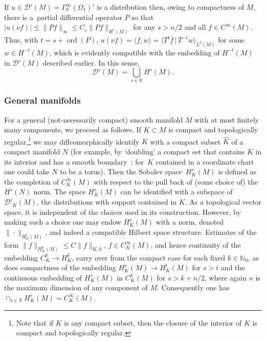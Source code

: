 \documentclass[pdftex]{sigma}
\numberwithin{equation}{section}
\newcommand{\RR}{{\mathbb R}}
\newcommand{\NN}{{\mathbb N}}
\newcommand{\GoinX}[1]{\Gamma_0^\infty({#1})}
\newcommand{\DD}{{\mathscr D}}
\newcommand{\ip}[2]{{\big\langle #1 \, \big|\, #2\big\rangle}}
\begin{document}
 If $u\in \DD'(M)= \GoinX{\Omega_1}'$ is a distribution then, owing to compactness of $M$, there is a~partial differential operator $P$ so that $|u(\nu f)|\le \|Pf\|_\infty \le C_s \|Pf\|_{H^s(M)}$ for any $s>n/2$ and all $f\in C^\infty(M)$. Thus, with $t=s+\operatorname{ord} (P)$, $u(\nu f)= \big\langle \overline{f},w\big\rangle= \ip{T^t \overline{f}}{T^{-t}w}_{L^2(M)}$ for some $w\in H^{-t}(M)$, which is evidently compatible with the embedding of $H^{-t}(M)$ in $\DD'(M)$
 described earlier. In this sense,
 \begin{equation*}
 	\DD'(M) = \bigcup_{s\in\RR} H^{s}(M).
 \end{equation*}

 \subsubsection{General manifolds}

 For a general (not-necessarily compact) smooth manifold $M$ with at most finitely many components,
 we proceed as follows. If $K\subset M$ is compact and topologically regular,\footnote{Note that if $K$ is any compact subset, then the closure of the interior of $K$ is compact and topologically regular.} we may
 diffeomorphically identify $K$ with a compact subset $\hat{K}$ of a compact manifold $N$ (for example, by `doubling' a compact set that contains $K$ in its interior and has a smooth boundary~\cite{BaerWafo:2015}; for~$K$ contained in a coordinate chart one could take $N$ to be a torus). Then the Sobolev space~$H^s_K(M)$ is defined as the completion of
 $C^\infty_K(M)$ with respect to the pull back of (some choice of) the~$H^s(N)$ norm. The space $H^s_K(M)$ can be identified with a subspace of $\DD'_K(M)$, the distributions with support contained in $K$. As a topological vector space, it is independent of the choices used in its construction. However, by making such a choice one may
 endow $H^s_K(M)$ with a norm, denoted $\|\cdot\|_{H^s_K(M)}$, and indeed a compatible Hilbert space structure.
 Estimates of the form
 $\|f\|_{H^k_K(M)}\le C\|f\|_{K,k}$, $f\in C^\infty_K(M)$, and hence continuity of
 the embedding $C^k_K\to H^k_K$, carry over from the compact case for each fixed $k\in\NN_0$, as does compactness of the embedding $H^{s}_K(M)\to H^{t}_K(M)$ for $s>t$
 and the continuous embedding of $H^s_K(M)$ in $C^k_K(M)$ for $s>k+n/2$,
 where again $n$ is the maximum dimension of any component of $M$.
 Consequently one has $\cap_{s\in\RR} H^s_K(M)=C^\infty_K(M)$.
\end{document}
